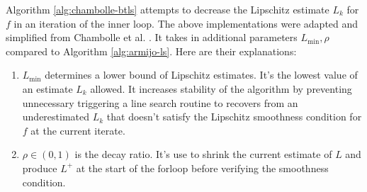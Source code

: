 \documentclass[12pt]{report}
\begin{document}
            \par
            Algorithm \ref{alg:chambolle-btls} attempts to decrease the Lipschitz estimate $L_k$ for $f$ in an iteration of the inner loop. 
            The above implementations were adapted and simplified from Chambolle et al. \cite{calatroni_backtracking_2019}. 
            It takes in additional parameters $L_{\min}, \rho$ compared to Algorithm \ref{alg:armijo-ls}. 
            Here are their explanations: 
            \begin{enumerate}
                \item $L_{\min}$ determines a lower bound of Lipschitz estimates. It's the lowest value of an estimate $L_k$ allowed. It increases stability of the algorithm by preventing unnecessary triggering a line search routine to recovers from an underestimated $L_k$ that doesn't satisfy the Lipschitz smoothness condition for $f$ at the current iterate. 
                \item $\rho \in (0, 1)$ is the decay ratio. It's use to shrink the current estimate of $L$ and produce $L^+$ at the start of the forloop before verifying the smoothness condition. 
            \end{enumerate}
\end{document}
